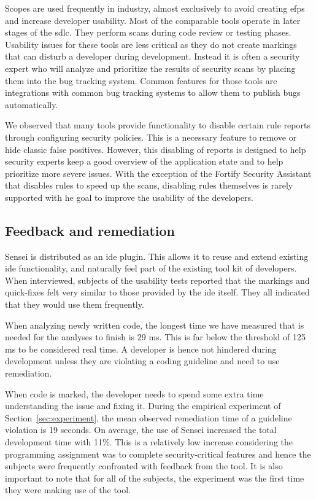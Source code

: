 Scopes are used frequently in industry, almost exclusively to avoid creating \glspl{efp} and increase developer usability.
Most of the comparable tools operate in later stages of the \gls{sdlc}.
They perform scans during code review or testing phases.
Usability issues for these tools are less critical as they do not create markings that can disturb a developer during development.
Instead it is often a security expert who will analyze and prioritize the results of security scans by placing them into the bug tracking system.
Common features for those tools are integrations with common bug tracking systems to allow them to publish bugs automatically.

We observed that many tools provide functionality to disable certain rule reports through configuring security policies.
This is a necessary feature to remove or hide classic false positives.
However, this disabling of reports is designed to help security experts keep a good overview of the application state and to help prioritize more severe issues.
With the exception of the Fortify Security Assistant that disables rules to speed up the scans, disabling rules themselves is rarely supported with he goal to improve the usability of the developers.

\subsection{Feedback and remediation}
Sensei is distributed as an \gls{ide} plugin.
This allows it to reuse and extend existing \gls{ide} functionality, and naturally feel part of the existing tool kit of developers.
When interviewed, subjects of the usability tests reported that the markings and quick-fixes felt very similar to those provided by the \gls{ide} itself.
They all indicated that they would use them frequently.

When analyzing newly written code, the longest time we have measured that is needed for the analyses to finish is 29 ms.
This is far below the threshold of 125 ms to be considered real time.
A developer is hence not hindered during development unless they are violating a coding guideline and need to use remediation.

When code is marked, the developer needs to spend some extra time understanding the issue and fixing it.
During the empirical experiment of Section~\ref{sec:experiment}, the mean observed remediation time of a guideline violation is 19 seconds.
On average, the use of Sensei increased the total development time with 11\%.
This is a relatively low increase considering the programming assignment was to complete security-critical features and hence the subjects were frequently confronted with feedback from the tool.
It is also important to note that for all of the subjects, the experiment was the first time they were making use of the tool.

